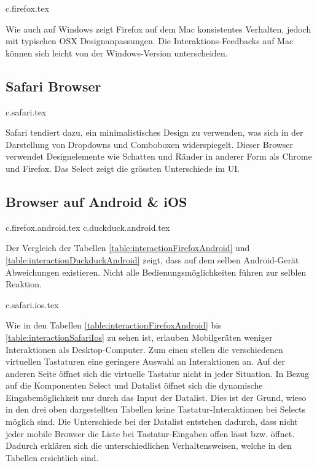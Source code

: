 {c.firefox.tex}

Wie auch auf Windows zeigt Firefox auf dem Mac konsistentes Verhalten, jedoch mit typischen OSX Designanpassungen. 
Die Interaktions-Feedbacks auf Mac können sich leicht von der Windows-Version unterscheiden.


\clearpage
\subsection{Safari Browser}
\label{sec:safariBrowser}

{c.safari.tex}

Safari tendiert dazu, ein minimalistisches Design zu verwenden, was sich in der Darstellung von Dropdowns und Comboboxen widerspiegelt.
Dieser Browser verwendet Designelemente wie Schatten und Ränder in anderer Form als Chrome und Firefox.
Das Select zeigt die grössten Unterschiede im UI.


\clearpage
\subsection{Browser auf Android \& iOS}
\label{sec:mobileBrowser}

{c.firefox.android.tex}
{c.duckduck.android.tex}

Der Vergleich der Tabellen \ref{table:interactionFirefoxAndroid} und \ref{table:interactionDuckduckAndroid} zeigt, dass auf dem selben Android-Gerät Abweichungen existieren.
Nicht alle Bedienungsmöglichkeiten führen zur selblen Reaktion.

\clearpage
{c.safari.ios.tex}

Wie in den Tabellen \ref{table:interactionFirefoxAndroid} bis \ref{table:interactionSafariIos} zu sehen ist, erlauben Mobilgeräten weniger Interaktionen als Desktop-Computer.
Zum einen stellen die verschiedenen virtuellen Tastaturen eine geringere Auswahl an Interaktionen an.
Auf der anderen Seite öffnet sich die virtuelle Tastatur nicht in jeder Situation. 
In Bezug auf die Komponenten Select und Datalist öffnet sich die dynamische Eingabemöglichkeit nur durch das Input der Datalist.
Dies ist der Grund, wieso in den drei oben dargestellten Tabellen keine Tastatur-Interaktionen bei Selects möglich sind. 
Die Unterschiede bei der Datalist entstehen dadurch, dass nicht jeder mobile Browser die Liste bei Tastatur-Eingaben offen lässt bzw. öffnet.
Dadurch erklären sich die unterschiedlichen Verhaltensweisen, welche in den Tabellen ersichtlich sind.

